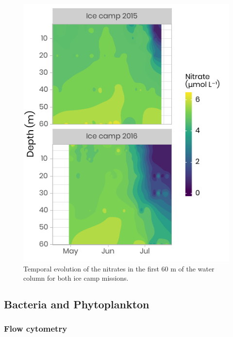 \documentclass[essd, manuscript]{copernicus}
\begin{document}
\begin{figure}[H]
	\centering
	\includegraphics[scale = 1]{../../../../graphs/fig08.pdf}
	\caption{Temporal evolution of the nitrates in the first 60 m of the water column for both ice camp missions.}
\end{figure}

\subsection{Bacteria and Phytoplankton}

\subsubsection{Flow cytometry}
\end{document}
